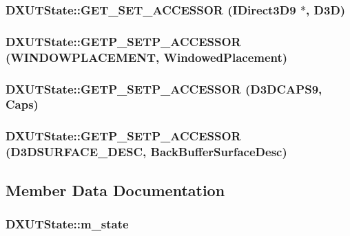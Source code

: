 \label{class_d_x_u_t_state_ab61abb00dd9ec46ed0ac175a3c8da16e}
\hypertarget{class_d_x_u_t_state_af91379ffd21a9d206e8844fb33a8a0f1}{
\subsubsection[{GET\_\-SET\_\-ACCESSOR}]{\setlength{\rightskip}{0pt plus 5cm}DXUTState::GET\_\-SET\_\-ACCESSOR (IDirect3D9 $\ast$, \/  D3D)}}
\label{class_d_x_u_t_state_af91379ffd21a9d206e8844fb33a8a0f1}
\hypertarget{class_d_x_u_t_state_a5536ff55b878141213e29c0a475fb273}{
\subsubsection[{GETP\_\-SETP\_\-ACCESSOR}]{\setlength{\rightskip}{0pt plus 5cm}DXUTState::GETP\_\-SETP\_\-ACCESSOR (WINDOWPLACEMENT, \/  WindowedPlacement)}}
\label{class_d_x_u_t_state_a5536ff55b878141213e29c0a475fb273}
\hypertarget{class_d_x_u_t_state_aa7a2337209f6a049279f2e906c51a582}{
\subsubsection[{GETP\_\-SETP\_\-ACCESSOR}]{\setlength{\rightskip}{0pt plus 5cm}DXUTState::GETP\_\-SETP\_\-ACCESSOR (D3DCAPS9, \/  Caps)}}
\label{class_d_x_u_t_state_aa7a2337209f6a049279f2e906c51a582}
\hypertarget{class_d_x_u_t_state_a5ea545943abe76448a1ba9200b81d99a}{
\subsubsection[{GETP\_\-SETP\_\-ACCESSOR}]{\setlength{\rightskip}{0pt plus 5cm}DXUTState::GETP\_\-SETP\_\-ACCESSOR (D3DSURFACE\_\-DESC, \/  BackBufferSurfaceDesc)}}
\label{class_d_x_u_t_state_a5ea545943abe76448a1ba9200b81d99a}


\subsection{Member Data Documentation}
\hypertarget{class_d_x_u_t_state_ac77bc02614deabbbbfde3190f2f0b9fe}{
\subsubsection[{m\_\-state}]{ {\bf DXUTState::m\_\-state}}}
\label{class_d_x_u_t_state_ac77bc02614deabbbbfde3190f2f0b9fe}


